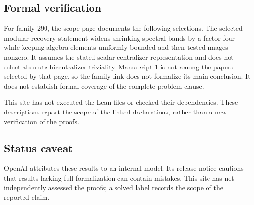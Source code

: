 \documentclass[11pt]{article}
\begin{document}
\subsection{Formal verification}
For family 290, the scope page documents the following selections. The selected modular recovery statement widens shrinking spectral bands by a factor four while keeping algebra elements uniformly bounded and their tested images nonzero. It assumes the stated scalar-centralizer representation and does not select absolute bicentralizer triviality. Manuscript 1 is not among the papers selected by that page, so the family link does not formalize its main conclusion. It does not establish formal coverage of the complete problem clause.

This site has not executed the Lean files or checked their dependencies. These descriptions report the scope of the linked declarations, rather than a new verification of the proofs.

\subsection{Status caveat}
OpenAI attributes these results to an internal model. Its release notice cautions that results lacking full formalization can contain mistakes. This site has not independently assessed the proofs; a solved label records the scope of the reported claim.
\end{document}
